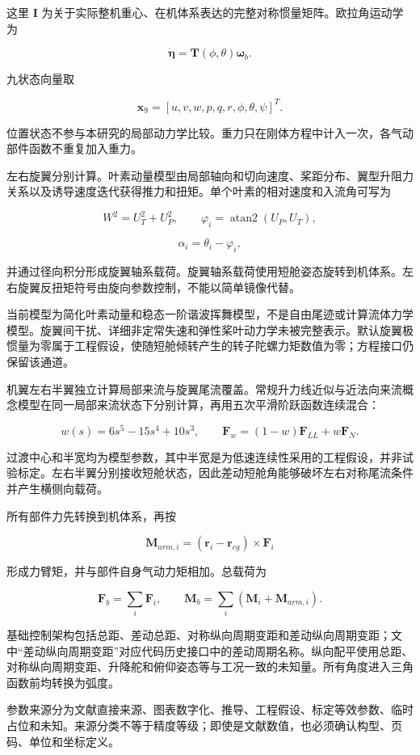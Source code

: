 \documentclass[UTF8,11pt,oneside,openany,fontset=windows]{ctexbook}
\begin{document}
这里 \(\mathbf{I}\)
为关于实际整机重心、在机体系表达的完整对称惯量矩阵。欧拉角运动学为

\[\dot{\boldsymbol{\eta}}=\mathbf{T}(\phi,\theta)\boldsymbol{\omega}_b.\]

九状态向量取

\[\mathbf{x}_9=[u,v,w,p,q,r,\phi,\theta,\psi]^T.\]

位置状态不参与本研究的局部动力学比较。重力只在刚体方程中计入一次，各气动部件函数不重复加入重力。

左右旋翼分别计算。叶素动量模型由局部轴向和切向速度、桨距分布、翼型升阻力关系以及诱导速度迭代获得推力和扭矩。单个叶素的相对速度和入流角可写为

\[W^2=U_T^2+U_P^2,\qquad \varphi_i=\operatorname{atan2}(U_P,U_T),\]

\[\alpha_i=\theta_i-\varphi_i,\]

并通过径向积分形成旋翼轴系载荷。旋翼轴系载荷使用短舱姿态旋转到机体系。左右旋翼反扭矩符号由旋向参数控制，不能以简单镜像代替。

当前模型为简化叶素动量和稳态一阶谐波挥舞模型，不是自由尾迹或计算流体力学模型。旋翼间干扰、详细非定常失速和弹性桨叶动力学未被完整表示。默认旋翼极惯量为零属于工程假设，使随短舱倾转产生的转子陀螺力矩数值为零；方程接口仍保留该通道。

机翼左右半翼独立计算局部来流与旋翼尾流覆盖。常规升力线近似与近法向来流概念模型在同一局部来流状态下分别计算，再用五次平滑阶跃函数连续混合：

\[w(s)=6s^5-15s^4+10s^3,\qquad
\mathbf{F}_w=(1-w)\mathbf{F}_{LL}+w\mathbf{F}_{N}.\]

过渡中心和半宽均为模型参数，其中半宽是为低速连续性采用的工程假设，并非试验标定。左右半翼分别接收短舱状态，因此差动短舱角能够破坏左右对称尾流条件并产生横侧向载荷。

所有部件力先转换到机体系，再按

\[\mathbf{M}_{arm,i}=(\mathbf{r}_i-\mathbf{r}_{cg})\times\mathbf{F}_i\]

形成力臂矩，并与部件自身气动力矩相加。总载荷为

\[\mathbf{F}_b=\sum_i\mathbf{F}_i,\qquad
\mathbf{M}_b=\sum_i(\mathbf{M}_i+\mathbf{M}_{arm,i}).\]

基础控制架构包括总距、差动总距、对称纵向周期变距和差动纵向周期变距；文中``差动纵向周期变距''对应代码历史接口中的差动周期名称。纵向配平使用总距、对称纵向周期变距、升降舵和俯仰姿态等与工况一致的未知量。所有角度进入三角函数前均转换为弧度。

参数来源分为文献直接来源、图表数字化、推导、工程假设、标定等效参数、临时占位和未知。来源分类不等于精度等级；即使是文献数值，也必须确认构型、页码、单位和坐标定义。
\end{document}
